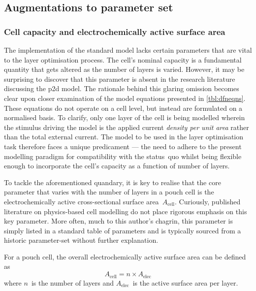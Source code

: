 
\subsection{Augmentations to parameter set}\label{sec:p2daugmentations}

\subsubsection*{Cell capacity and electrochemically active surface area}

The   implementation  of  the standard    model
lacks  certain parameters that are vital to the  layer optimisation process. The
cell's nominal capacity is a fundamental quantity that gets  altered as the
number of layers is varied. However, it may be surprising  to discover that this
parameter is absent in the  research literature  discussing the  \gls{p2d}
model.  The rationale behind this glaring omission becomes clear  upon closer
examination of the model equations presented in  \cref{tbl:dfneqns}. These
equations do not  operate on a cell level, but  instead are formulated on a
normalised  basis. To clarify, only one layer of the  cell is being modelled
wherein the  stimulus driving the model is  the applied  current  \emph{density
per  unit area}  rather  than the  total external current. The model to be  used
in the layer optimisation task therefore faces  a unique  predicament ---  the
need  to adhere  to the  present modelling paradigm for compatibility  with the
\mbox{status quo} whilst being  flexible enough to incorporate the cell's
capacity as a function of number of layers.

To  tackle  the  aforementioned  quandary,  it   is  key  to  realise  that  the
core  parameter  that  varies  with  the  number  of  layers  in  a  pouch  cell
is  the electrochemically  active cross-sectional  surface area~$A_\text{cell}$.
Curiously, published  literature on  physics-based cell  modelling do  not place
rigorous  emphasis on  this key  parameter. More  often, much  to this  author's
chagrin, this parameter  is simply listed in a standard  table of parameters and
is typically sourced from a historic parameter-set without further explanation.

For  a pouch  cell, the  overall electrochemically  active surface  area can  be
defined as
\begin{equation}\label{eq:overallarea}
    A_\text{cell} = n \times A_\text{elec}
\end{equation}
where $n$~is the number of layers and $A_\text{elec}$~is the active surface area
per layer.


